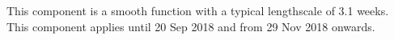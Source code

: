 This component is a smooth function with a typical lengthscale of 3.1 weeks.
This component applies until 20 Sep 2018 and from 29 Nov 2018 onwards.